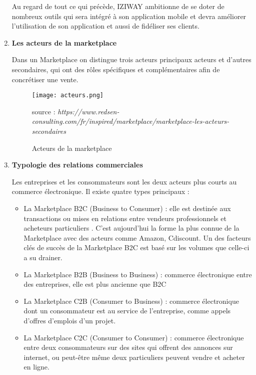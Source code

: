 \begin{enumerate}
Au regard de tout ce qui précède, IZIWAY ambitionne de se doter de nombreux outils qui sera intégré à son application mobile et devra améliorer l’utilisation de son application et aussi de fidéliser ses clients.

		
		\item \textbf{Les acteurs de la marketplace} 
		
Dans un Marketplace on distingue trois acteurs principaux acteurs et d’autres secondaires, qui ont des rôles spécifiques et complémentaires afin de concrétiser une vente. 

\begin{figure}[H]
	\centering
	\texttt{[image: acteurs.png]}
	\caption{Acteurs de la marketplace}{ \begin{center} source : \textit{https://www.redsen-consulting.com/fr/inspired/marketplace/marketplace-les-acteurs-secondaires} \end{center}}
	\label{fig:acteurs}
\end{figure}

\item \textbf{Typologie des relations commerciales } 

Les entreprises et les consommateurs sont les deux acteurs plus courts au commerce électronique. Il existe quatre types principaux\cite{Ref12} :

\begin{itemize}[label=\textbullet, font=\LARGE \color{blue}]
	\item La Marketplace B2C (Business to Consumer) : elle est destinée aux transactions ou mises en relations entre vendeurs professionnels et acheteurs particuliers . C’est aujourd’hui la forme la plus connue de la Marketplace avec des acteurs comme Amazon, Cdiscount. Un des facteurs clés de succès de la Marketplace B2C est basé sur les volumes que celle-ci a su drainer.
	\item La Marketplace B2B (Business to Business) : commerce électronique entre des entreprises, elle est plus ancienne que B2C
	\item La Marketplace C2B (Consumer to Business) : commerce électronique dont un consommateur est au service de l’entreprise, comme appels d’offres d’emplois d’un projet.
	\item La Marketplace C2C (Consumer to Consumer) : commerce électronique entre deux consommateurs sur des sites qui offrent des annonces sur internet, ou peut-être même deux particuliers peuvent vendre et acheter en ligne.
\end{itemize}


\end{enumerate}
